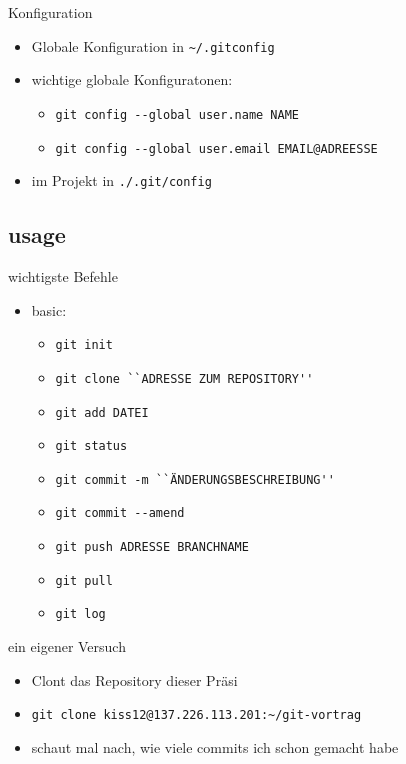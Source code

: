 \documentclass{beamer}
\begin{document}
\begin{frame}[fragile]{Konfiguration}
	\begin{itemize}
		\item Globale Konfiguration in \verb+~/.gitconfig+
		\item wichtige globale Konfiguratonen:
			\begin{itemize}
				\item \verb+git config --global user.name NAME+
				\item \verb+git config --global user.email EMAIL@ADREESSE+
			\end{itemize}
		\item im Projekt in \verb+./.git/config+
	\end{itemize}
\end{frame}

\subsection{usage}
\begin{frame}[fragile]{wichtigste Befehle}
	\begin{itemize}
		\item basic:
			\begin{itemize}
				\item \verb+git init+
				\item \verb+git clone ``ADRESSE ZUM REPOSITORY''+
				\item \verb+git add DATEI+
				\item \verb+git status+
				\item \verb+git commit -m ``ÄNDERUNGSBESCHREIBUNG''+
				\item \verb+git commit --amend+
				\item \verb+git push ADRESSE BRANCHNAME+
				\item \verb+git pull+
				\item \verb+git log+
			\end{itemize}
	\end{itemize}
	\begin{block}{ein eigener Versuch}
		\begin{itemize}
			\item Clont das Repository dieser Präsi
			\item \verb|git clone kiss12@137.226.113.201:~/git-vortrag|
			\item schaut mal nach, wie viele commits ich schon gemacht habe
		\end{itemize}
	\end{block}
\end{frame}
\end{document}
